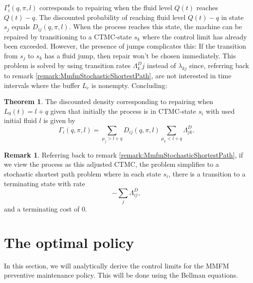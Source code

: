 \documentclass[a4paper]{thesis}
\theoremstyle{definition}
\newtheorem{remark}{Remark}[chapter]
\newtheorem{theorem}{Theorem}[section]
\begin{document}
$\Gamma_i^t(q,\pi,l)$ corresponds to repairing when the fluid level $Q(t)$ reaches $Q(t)-q$.
The discounted probability of reaching fluid level $Q(t)-q$ in state $s_j$ equals $D_{ij}(q, \pi,l)$.
When the process reaches this state, the machine can be repaired by transitioning to a CTMC-state $s_k$ where the control limit has already been exceeded.
However, the presence of jumps complicates this:
If the transition from $s_j$ to $s_k$ has a fluid jump, then repair won't be chosen immediately.
This problem is solved by using transition rates $\Lambda^D_kj$ instead of $\lambda_{kj}$ since, referring back to remark \ref{remark:MmfmStochasticShortestPath}, are not interested in time intervals where the buffer $L_c$ is nonempty.
Concluding:

\begin{theorem}
	The discounted density corresponding to repairing when $L_0(t)=l+q$ given that initially the process is in CTMC-state $s_i$ with used initial fluid $l$ is given by
	\[
	\Gamma_i(q,\pi,l)=\sum\limits_{\mu_j>l+q}D_{ij}(q,\pi,l)\sum\limits_{\mu_k<l+q}\Lambda_{jk}^D.
	\]
\end{theorem}


\begin{remark}
	Referring back to remark \ref{remark:MmfmStochasticShortestPath}, if we view the process as this adjusted CTMC, the problem simplifies to a stochastic shortest path problem where in each state $s_i$, there is a transition to a terminating state with rate
	\[
	-\sum\limits_j \Lambda^D_{ij},
	\]
	and a terminating cost of 0.
\end{remark} \section{The optimal policy}
In this section, we will analytically derive the control limits for the MMFM preventive maintenance policy.
This will be done using the Bellman equations.
\end{document}
